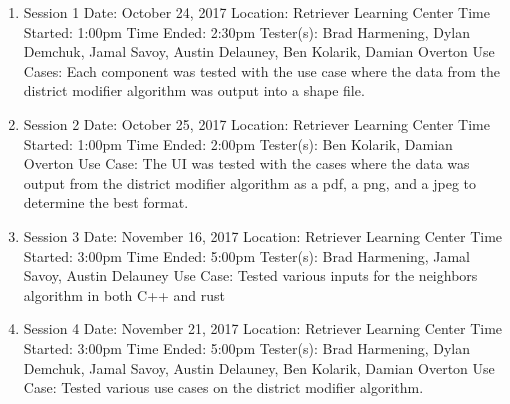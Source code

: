 \documentclass{article}
\begin{document}
\begin{addmargin}[2em]{0em}
\begin{enumerate}
	\item Session 1\newline
	Date: October 24, 2017\newline
	Location: Retriever Learning Center\newline
	Time Started: 1:00pm\newline
	Time Ended: 2:30pm\newline
	Tester(s): Brad Harmening, Dylan Demchuk, Jamal Savoy, Austin Delauney, Ben Kolarik, Damian Overton\newline
	Use Cases: Each component was tested with the use case where the data from the district modifier algorithm was output into a shape file. \newline
	
	\item Session 2\newline
	Date: October 25, 2017\newline
	Location: Retriever Learning Center\newline
	Time Started: 1:00pm\newline
	Time Ended: 2:00pm\newline
	Tester(s): Ben Kolarik, Damian Overton\newline
	Use Case: The UI was tested with the cases where the data was output from the district modifier algorithm as a pdf, a png, and a jpeg to determine the best format.\newline
	
	\item Session 3\newline
	Date: November 16, 2017\newline
	Location: Retriever Learning Center\newline
	Time Started: 3:00pm\newline
	Time Ended: 5:00pm\newline
	Tester(s): Brad Harmening, Jamal Savoy, Austin Delauney\newline
	Use Case: Tested various inputs for the neighbors algorithm in both C++ and rust
	
	\item Session 4\newline
	Date: November 21, 2017\newline
	Location: Retriever Learning Center\newline
	Time Started: 3:00pm\newline
	Time Ended: 5:00pm\newline
	Tester(s): Brad Harmening, Dylan Demchuk, Jamal Savoy, Austin Delauney, Ben Kolarik, Damian Overton\newline
	Use Case: Tested various use cases on the district modifier algorithm.\newline
	

\end{enumerate}
\end{addmargin}
\end{document}
